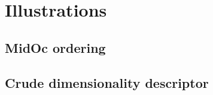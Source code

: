 

\section{Illustrations}
	\subsection{MidOc ordering}
		
		\label{lod.fig:density-variation}
		
		 
		
		
	\subsection{Crude dimensionality descriptor}